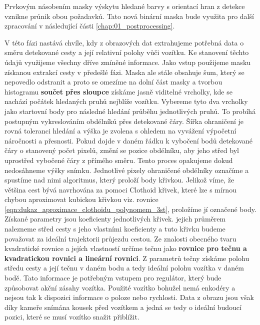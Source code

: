\documentclass[czech, bc, kky, he, iso690alph]{fasthesis}
\begin{document}
            	Prvkovým násobením masky výskytu hledané barvy s orientací hran z detekce vznikne průnik obou požadavků. Tato nová binární maska bude využita pro další zpracování v následující části \ref{chap:01_postprocessing}.
            	
            	
                V této fázi nastává chvíle, kdy z obrazových dat extrahujeme potřebná data o směru detekované cesty a její relativní polohy vůči vozítku. Ke stanovení těchto údajů využijeme všechny dříve zmíněné informace. Jako vstup použijeme masku získanou extrakcí cesty v předešlé fázi. Maska ale stále obsahuje šum, který se nepovedlo odstranit a proto se omezíme na dolní část masky a tvorbou histogramu \textbf{součet přes sloupce} získáme jasně viditelné vrcholky, kde se nachází počátek hledaných pruhů nejblíže vozítku. Vybereme tyto dva vrcholky jako startovní body pro následné hledání průběhu jednotlivých pruhů. To probíhá postupným vykreslováním obdélníků přes detekované čáry. Šířka ohraničení je rovná toleranci hledání a výška je zvolena s ohledem na vyvážení výpočetní náročnosti a přesnosti. Pokud dojde v daném řádku k vybočení bodů detekované čáry o stanovený počet pixelů, změní se pozice obdélníku, aby jeho střed byl uprostřed vybočené čáry z přímého směru. Tento proces opakujeme dokud nedosáhneme výšky snímku. Jednotlivé pixely ohraničené obdélníky označíme a spustíme nad nimi algoritmus, který proloží body křivkou. Jelikož víme, že většina cest bývá navrhována za pomoci Clothoid křivek, které lze s mírnou chybou aproximovat kubickou křivkou viz. rovnice \ref{eqn:dukaz_aproximace_clothoidu_polynomem_3st}, proložíme jí označené body. Získané parametry jsou koeficienty jednotlivých křivek. jejich průměrem nalezneme střed cesty s jeho vlastními koeficienty a tuto křivku budeme považovat za ideální trajektorii průjezdu cestou. Ze znalosti obecného tvaru kvadratické rovnice a jejích vlastností určíme tečnu jako \textbf{rovnice pro tečnu a kvadratickou rovnici a lineární rovnici}. Z parametrů tečny získáme polohu středu cesty a její tečnu v daném bodu a tedy ideální polohu vozítka v daném bodě. Tato informace je potřebným vstupem pro regulátor, který bude způsobovat akční zásahy vozítka. Použité vozítko bohužel nemá enkodéry a nejsou tak k dispozici informace o poloze nebo rychlosti. Data z obrazu jsou však díky kameře snímána kousek před vozítkem a jedná se tedy o ideální budoucí pozici, které se musí vozítko snažit přiblížit.
\end{document}
